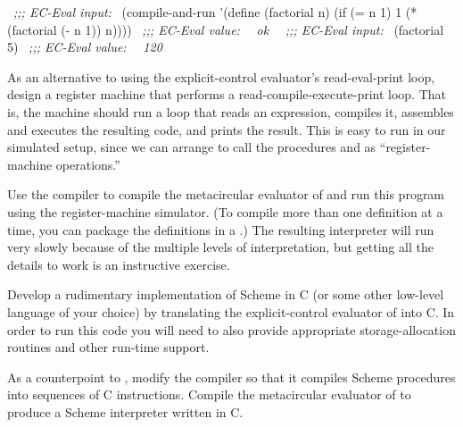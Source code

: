 \begin{exerciseGroup}
\begin{codeBlock}
~\textit{;;; EC-Eval input:}~
(compile-and-run
 '(define (factorial n)
    (if (= n 1) 1 (* (factorial (- n 1)) n))))
~\textit{;;; EC-Eval value:}~
~\textit{ok}~
~\textit{;;; EC-Eval input:}~
(factorial 5)
~\textit{;;; EC-Eval value:}~
~\textit{120}~
\end{codeBlock}

\label{Exercise 5.49}
 As an alternative to using the
explicit-control evaluator's read-eval-print loop, design a register machine
that performs a read-compile-execute-print loop.  That is, the machine should
run a loop that reads an expression, compiles it, assembles and executes the
resulting code, and prints the result.  This is easy to run in our simulated
setup, since we can arrange to call the procedures  and
 as ``register-machine operations.''

\label{Exercise 5.50}
 Use the compiler to compile the
metacircular evaluator of  and run this program using the
register-machine simulator.  (To compile more than one definition at a time,
you can package the definitions in a .)  The resulting interpreter
will run very slowly because of the multiple levels of interpretation, but
getting all the details to work is an instructive exercise.

\label{Exercise 5.51}
 Develop a rudimentary
implementation of Scheme in C (or some other low-level language of your choice)
by translating the explicit-control evaluator of  into C.  In
order to run this code you will need to also provide appropriate
storage-allocation routines and other run-time support.

\label{Exercise 5.52}
 As a counterpoint to
, modify the compiler so that it compiles Scheme procedures
into sequences of C instructions.  Compile the metacircular evaluator of
 to produce a Scheme interpreter written in C.
\end{exerciseGroup}
